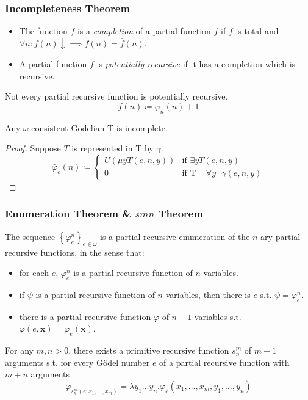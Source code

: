\documentclass[UTF8,aspectratio=43,11pt,colorlinks,compress,openany]{beamer}%
\begin{document}
\begin{frame}\frametitle{Incompleteness Theorem}
\setlength\abovedisplayskip{0pt}
\setlength\belowdisplayskip{0pt}
	\begin{itemize}
		\item The function $\bar{f}$ is a \emph{completion} of a partial function $f$ if $\bar{f}$ is total and $\forall n: f(n)\downarrow\implies f(n)=\bar{f}(n)$.
		\item A partial function $f$ is \emph{potentially recursive} if it has a completion which is recursive.
	\end{itemize}
	\begin{block}{Not every partial recursive function is potentially recursive.}
		\[f(n)\coloneqq \varphi_n(n)+1\]
	\end{block}
	\begin{theorem}
		Any $\omega$-consistent G\"odelian $\mathrm{T}$ is incomplete.
	\end{theorem}
	\begin{proof}
		Suppose $T$ is represented in $\mathrm{T}$ by $\gamma$.
		\[
		\bar{\varphi}_e(n)\coloneqq 
		\begin{cases}
		U(\mu y T(e,n,y)) &\text{if } \exists y T(e,n,y)\\
		0 &\text{if } \mathrm{T}\vdash\forall y\neg\gamma(e,n,y)
		\end{cases}
		\]
	\end{proof}
\end{frame}

\begin{frame}\frametitle{Enumeration Theorem \& $smn$ Theorem}
	\begin{theorem}
		The sequence $\left\{\varphi_e^n\right\}_{e\in\omega}$ is a partial recursive enumeration of the $n$-ary partial recursive functions, in the sense that: 
		\begin{itemize}
			\item for each $e$, $\varphi_e^n$ is a partial recursive function of $n$ variables.
			\item if $\psi$ is a partial recursive function of $n$ variables, then there is $e$ s.t. $\psi=\varphi_e^n$.
			\item there is a partial recursive function $\varphi$ of $n+1$ variables s.t. $\varphi(e,\mathbf{x})=\varphi_e(\mathbf{x})$.
		\end{itemize}
	\end{theorem}
	\begin{theorem}
		For any $m, n > 0$, there exists a primitive recursive function $s_n^m$ of $m + 1$ arguments s.t. for every G\"odel number $e$ of a partial recursive function with $m + n$ arguments
	\setlength\abovedisplayskip{0pt}
	\setlength\belowdisplayskip{0pt}
		\[\varphi_{s_n^m (e,x_1,\dots,x_m)}=\lambda y_1\dots y_n.\varphi_e(x_1,\dots,x_m,y_1,\dots,y_n)\]
	\end{theorem}
\end{frame}
\end{document}
